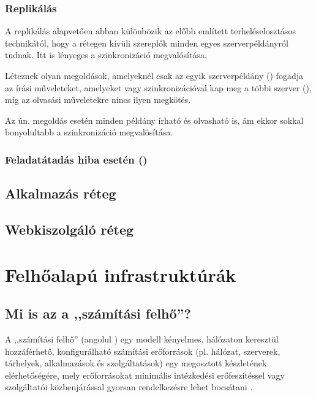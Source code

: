 
\subsubsection{Replikálás}

A replikálás alapvetően abban különbözik az előbb említett terheléselosztásos technikától, hogy a rétegen kívüli szereplők minden egyes szerverpéldányról tudnak. Itt is lényeges a szinkronizáció megvalósítása.

Léteznek olyan megoldások, amelyeknél csak az egyik szerverpéldány () fogadja az írási műveleteket, amelyeket  vagy  szinkronizációval kap meg a többi szerver (), míg az olvasási műveletekre nincs ilyen megkötés.

Az ún.  megoldás esetén minden példány írható és olvasható is, ám ekkor sokkal bonyolultabb a szinkronizáció megvalósítása.

\subsubsection{Feladatátadás hiba esetén ()}


\subsection{Alkalmazás réteg}


\subsection{Webkiszolgáló réteg}


\section{Felhőalapú infrastruktúrák}
\subsection{Mi is az a ,,számítási felhő''?}

A ,,számítási felhő'' (angolul ) egy modell kényelmes, hálózaton keresztül hozzáférhető, konfigurálható számítási erőforrások (pl. hálózat, szerverek, tárhelyek, alkalmazások és szolgáltatások) egy megosztott készletének elérhetőségére, mely erőforrásokat minimális intézkedési erőfeszítéssel vagy szolgáltatói közbenjárással gyorsan rendelkezésre lehet bocsátani \cite{nistsp800-145}.

